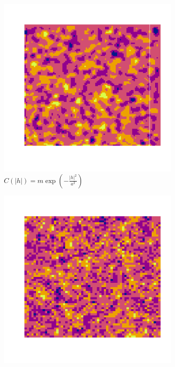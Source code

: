 \documentclass[10pt]{article} %
\begin{document}
\begin{figure}[h!]
    \centering
    \begin{subfigure}[b]{0.3\textwidth}
        \centering
        \includegraphics[width=\textwidth]{media/gauss_plasma.png}
        \caption{$C(|h|) = m \exp(-\frac{|h|^2}{a^2})$}
        \label{gauss plasma}
    \end{subfigure}
    \hfill
    \begin{subfigure}[b]{0.3\textwidth}
        \centering
        \includegraphics[width=\textwidth]{media/tent.png}

\end{subfigure}
\end{figure}
\end{document}
